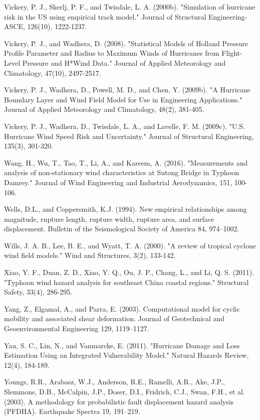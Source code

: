 Vickery, P. J., Skerlj, P. F., and Twisdale, L. A. (2000b). "Simulation of hurricane risk in the US using empirical track model." Journal of Structural Engineering-ASCE, 126(10), 1222-1237.

Vickery, P. J., and Wadhera, D. (2008). "Statistical Models of Holland Pressure Profile Parameter and Radius to Maximum Winds of Hurricanes from Flight-Level Pressure and H*Wind Data." Journal of Applied Meteorology and Climatology, 47(10), 2497-2517.

Vickery, P. J., Wadhera, D., Powell, M. D., and Chen, Y. (2009b). "A Hurricane Boundary Layer and Wind Field Model for Use in Engineering Applications." Journal of Applied Meteorology and Climatology, 48(2), 381-405.

Vickery, P. J., Wadhera, D., Twisdale, L. A., and Lavelle, F. M. (2009c). "U.S. Hurricane Wind Speed Risk and Uncertainty." Journal of Structural Engineering, 135(3), 301-320.

Wang, H., Wu, T., Tao, T., Li, A., and Kareem, A. (2016). "Measurements and analysis of non-stationary wind characteristics at Sutong Bridge in Typhoon Damrey." Journal of Wind Engineering and Industrial Aerodynamics, 151, 100-106.

Wells, D.L., and Coppersmith, K.J. (1994). New empirical relationships among magnitude, rupture length, rupture width, rupture area, and surface displacement. Bulletin of the Seismological Society of America 84, 974–1002.

Wills, J. A. B., Lee, B. E., and Wyatt, T. A. (2000). "A review of tropical cyclone wind field models." Wind and Structures, 3(2), 133-142.

Xiao, Y. F., Duan, Z. D., Xiao, Y. Q., Ou, J. P., Chang, L., and Li, Q. S. (2011). "Typhoon wind hazard analysis for southeast China coastal regions." Structural Safety, 33(4), 286-295.

Yang, Z., Elgamal, A., and Parra, E. (2003). Computational model for cyclic mobility and associated shear deformation. Journal of Geotechnical and Geoenvironmental Engineering 129, 1119–1127.

Yau, S. C., Lin, N., and Vanmarcke, E. (2011). "Hurricane Damage and Loss Estimation Using an Integrated Vulnerability Model." Natural Hazards Review, 12(4), 184-189.

Youngs, R.R., Arabasz, W.J., Anderson, R.E., Ramelli, A.R., Ake, J.P., Slemmons, D.B., McCalpin, J.P., Doser, D.I., Fridrich, C.J., Swan, F.H., et al. (2003). A methodology for probabilistic fault displacement hazard analysis (PFDHA). Earthquake Spectra 19, 191–219.

